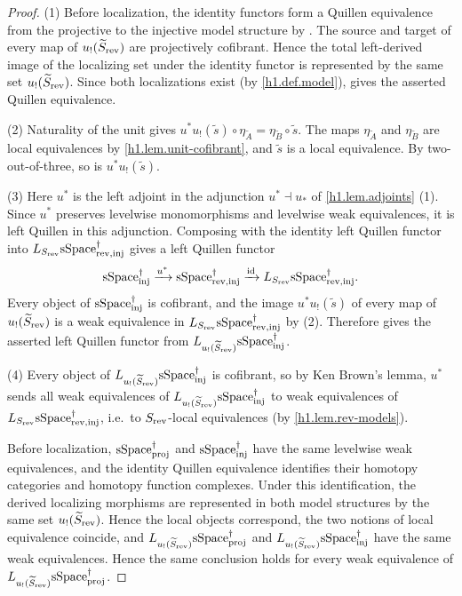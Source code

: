 \documentclass[a4paper,dvipdfmx,11pt]{amsart}
\begin{document}
\begin{proof}
  (1)
  Before localization, the identity functors form a Quillen equivalence from the projective to the injective model structure by \cite[Remark~A.2.8.6]{HTT}.
  The source and target of every map of $u_{!}(\widetilde S_{\mathrm{rev}})$ are projectively cofibrant.
  Hence the total left-derived image of the localizing set under the identity functor is represented by the same set $u_{!}(\widetilde S_{\mathrm{rev}})$.
  Since both localizations exist (by \cref{h1.def.model}), \cite[Theorem~3.3.20 (1)(b)]{Hir02} gives the asserted Quillen equivalence.

  (2)
  Naturality of the unit gives $u^{*}u_{!}(\widetilde s)\circ\eta_{\widetilde A}=\eta_{\widetilde B}\circ\widetilde s$.
  The maps $\eta_{\widetilde A}$ and $\eta_{\widetilde B}$ are local equivalences by \cref{h1.lem.unit-cofibrant}, and $\widetilde s$ is a local equivalence.
  By two-out-of-three, so is $u^{*}u_{!}(\widetilde s)$.

  (3)
  Here $u^{*}$ is the left adjoint in the adjunction $u^{*}\dashv u_{*}$ of \cref{h1.lem.adjoints} (1).
  Since $u^{*}$ preserves levelwise monomorphisms and levelwise weak equivalences, it is left Quillen in this adjunction.
  Composing with the identity left Quillen functor into $L_{S_{\mathrm{rev}}}\mathrm{sSpace}^{\dag}_{\mathrm{rev},\mathrm{inj}}$ gives a left Quillen functor
  \begin{align}
    \mathrm{sSpace}^{\dag}_{\mathrm{inj}}
    \xrightarrow{u^{*}}
    \mathrm{sSpace}^{\dag}_{\mathrm{rev},\mathrm{inj}}
    \xrightarrow{\operatorname{id}}
    L_{S_{\mathrm{rev}}}\mathrm{sSpace}^{\dag}_{\mathrm{rev},\mathrm{inj}}.
  \end{align}
  Every object of $\mathrm{sSpace}^{\dag}_{\mathrm{inj}}$ is cofibrant, and the image $u^{*}u_{!}(\widetilde s)$ of every map of $u_{!}(\widetilde S_{\mathrm{rev}})$ is a weak equivalence in $L_{S_{\mathrm{rev}}}\mathrm{sSpace}^{\dag}_{\mathrm{rev},\mathrm{inj}}$ by (2).
  Therefore \cite[Proposition~3.3.18 (1)]{Hir02} gives the asserted left Quillen functor from $L_{u_{!}(\widetilde S_{\mathrm{rev}})}\mathrm{sSpace}^{\dag}_{\mathrm{inj}}$.

  (4)
  Every object of $L_{u_{!}(\widetilde S_{\mathrm{rev}})}\mathrm{sSpace}^{\dag}_{\mathrm{inj}}$ is cofibrant, so by Ken Brown's lemma, $u^{*}$ sends all weak equivalences of $L_{u_{!}(\widetilde S_{\mathrm{rev}})}\mathrm{sSpace}^{\dag}_{\mathrm{inj}}$ to weak equivalences of $L_{S_{\mathrm{rev}}}\mathrm{sSpace}^{\dag}_{\mathrm{rev},\mathrm{inj}}$, 
  i.e.\ to $S_{\mathrm{rev}}$-local equivalences (by \cref{h1.lem.rev-models}).

  Before localization, $\mathrm{sSpace}^{\dag}_{\mathrm{proj}}$ and $\mathrm{sSpace}^{\dag}_{\mathrm{inj}}$ have the same levelwise weak equivalences, and the identity Quillen equivalence identifies their homotopy categories and homotopy function complexes.
  Under this identification, the derived localizing morphisms are represented in both model structures by the same set $u_{!}(\widetilde S_{\mathrm{rev}})$.
  Hence the local objects correspond, the two notions of local equivalence coincide, and $L_{u_{!}(\widetilde S_{\mathrm{rev}})}\mathrm{sSpace}^{\dag}_{\mathrm{proj}}$ and $L_{u_{!}(\widetilde S_{\mathrm{rev}})}\mathrm{sSpace}^{\dag}_{\mathrm{inj}}$ have the same weak equivalences.
  Hence the same conclusion holds for every weak equivalence of $L_{u_{!}(\widetilde S_{\mathrm{rev}})}\mathrm{sSpace}^{\dag}_{\mathrm{proj}}$.
\end{proof}
\end{document}
